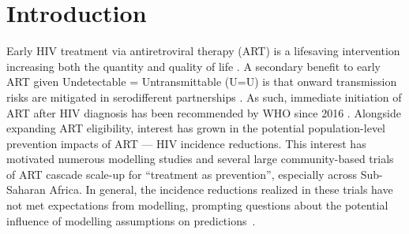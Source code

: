 \section{Introduction}\label{art.intro} %
Early HIV treatment via antiretroviral therapy (ART)
is a lifesaving intervention increasing both the quantity and quality of life
\cite{Gabillard2013,Maartens2014,Danel2015,Lundgren2015init}.
A secondary benefit to early ART given Undetectable = Untransmittable (U=U) is that
onward transmission risks are mitigated in serodifferent partnerships
\cite{Anglemyer2013,Cohen2016,Rodger2019}.
As such, immediate initiation of ART after HIV diagnosis
has been recommended by WHO since 2016 \cite{WHO2016art}.
Alongside expanding ART eligibility, interest has grown in
the potential population-level prevention impacts of ART --- \ie HIV incidence reductions.
This interest has motivated
numerous modelling studies \cite{Granich2009,Eaton2012,Eaton2014art,Knight2022sr} and
several large community-based trials \cite{Makhema2019,Havlir2019,Hayes2019,Iwuji2018}
of ART cascade scale-up for ``treatment as prevention'',
especially across Sub-Saharan Africa.
In general, the incidence reductions realized in these trials
have not met expectations from modelling, prompting questions about  %
the potential influence of modelling assumptions on predictions~\cite{Baral2019}.

